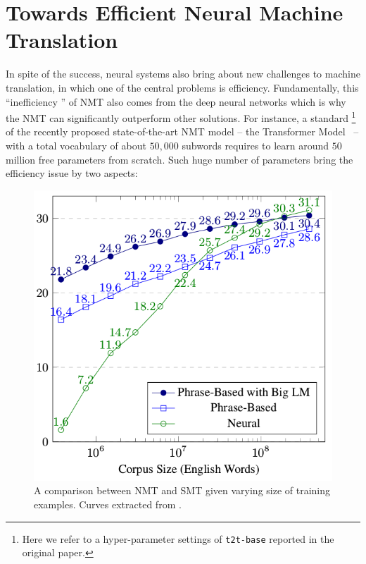 

\section{Towards Efficient Neural Machine Translation}

In spite of the success, neural systems also bring about new challenges to machine translation, in which one of the central problems is efficiency. Fundamentally, this ``inefficiency '' of NMT also comes from the deep neural networks which is why the NMT can significantly outperform other solutions. For instance, a standard \footnote{Here we refer to a hyper-parameter settings of  \texttt{t2t-base} reported in the original paper.} of the recently proposed state-of-the-art NMT model  -- the Transformer Model~\cite{vaswani2017attention} -- with a total vocabulary of about $50,000$ subwords requires to learn around $50$ million free parameters from scratch. 
Such huge number of parameters bring the efficiency issue by two aspects:
\begin{figure}[hptb]
\centering
\includegraphics[width=0.6\linewidth]{figs/intro/corpus_size.png}
\caption{\label{cp1.fig.corpus_size} A comparison between NMT and SMT given varying size of training examples. Curves extracted from .}
\end{figure}

